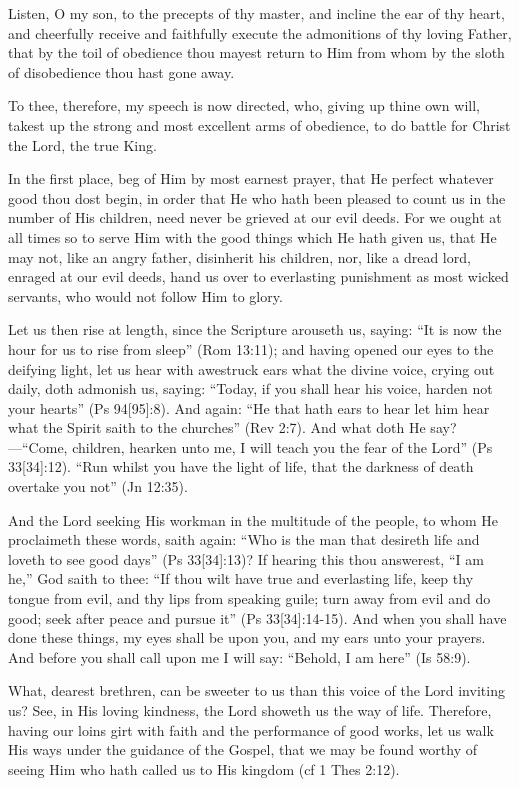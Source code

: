 
Listen, O my son, to the precepts of thy master, and incline the ear of thy heart, and cheerfully receive and faithfully execute the admonitions of thy loving Father, that by the toil of obedience thou mayest return to Him from whom by the sloth of disobedience thou hast gone away.

To thee, therefore, my speech is now directed, who, giving up thine own will, takest up the strong and most excellent arms of obedience, to do battle for Christ the Lord, the true King.

In the first place, beg of Him by most earnest prayer, that He perfect whatever good thou dost begin, in order that He who hath been pleased to count us in the number of His children, need never be grieved at our evil deeds. For we ought at all times so to serve Him with the good things which He hath given us, that He may not, like an angry father, disinherit his children, nor, like a dread lord, enraged at our evil deeds, hand us over to everlasting punishment as most wicked servants, who would not follow Him to glory.

Let us then rise at length, since the Scripture arouseth us, saying: ``It is now the hour for us to rise from sleep'' (Rom 13:11); and having opened our eyes to the deifying light, let us hear with awestruck ears what the divine voice, crying out daily, doth admonish us, saying: ``Today, if you shall hear his voice, harden not your hearts'' (Ps 94[95]:8). And again: ``He that hath ears to hear let him hear what the Spirit saith to the churches'' (Rev 2:7). And what doth He say?—``Come, children, hearken unto me, I will teach you the fear of the Lord'' (Ps 33[34]:12). ``Run whilst you have the light of life, that the darkness of death overtake you not'' (Jn 12:35).

And the Lord seeking His workman in the multitude of the people, to whom He proclaimeth these words, saith again: ``Who is the man that desireth life and loveth to see good days'' (Ps 33[34]:13)? If hearing this thou answerest, ``I am he,'' God saith to thee: ``If thou wilt have true and everlasting life, keep thy tongue from evil, and thy lips from speaking guile; turn away from evil and do good; seek after peace and pursue it'' (Ps 33[34]:14-15). And when you shall have done these things, my eyes shall be upon you, and my ears unto your prayers. And before you shall call upon me I will say: ``Behold, I am here'' (Is 58:9).

What, dearest brethren, can be sweeter to us than this voice of the Lord inviting us? See, in His loving kindness, the Lord showeth us the way of life. Therefore, having our loins girt with faith and the performance of good works, let us walk His ways under the guidance of the Gospel, that we may be found worthy of seeing Him who hath called us to His kingdom (cf 1 Thes 2:12).


